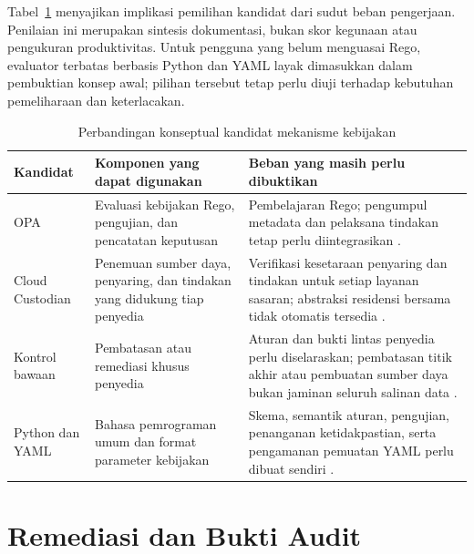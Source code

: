 Tabel~\ref{tab:b2-kandidat} menyajikan implikasi pemilihan kandidat dari sudut beban pengerjaan. Penilaian ini merupakan sintesis dokumentasi, bukan skor kegunaan atau pengukuran produktivitas. Untuk pengguna yang belum menguasai Rego, evaluator terbatas berbasis Python dan YAML layak dimasukkan dalam pembuktian konsep awal; pilihan tersebut tetap perlu diuji terhadap kebutuhan pemeliharaan dan keterlacakan.
\begingroup
\small
\setlength{\parskip}{0pt}
\setlength{\tabcolsep}{4pt}
\begin{table}[tbp]
\centering
\caption{Perbandingan konseptual kandidat mekanisme kebijakan}\label{tab:b2-kandidat}
\begin{tabular}{@{}>{\raggedright\arraybackslash}p{}>{\raggedright\arraybackslash}p{}>{\raggedright\arraybackslash}p{}@{}}
\toprule
Kandidat & Komponen yang dapat digunakan & Beban yang masih perlu dibuktikan \\
\midrule
OPA & Evaluasi kebijakan Rego, pengujian, dan pencatatan keputusan & Pembelajaran Rego; pengumpul metadata dan pelaksana tindakan tetap perlu diintegrasikan \autocite{b2c_opaOverview,b2c_opaTesting}. \\
\addlinespace
Cloud Custodian & Penemuan sumber daya, penyaring, dan tindakan yang didukung tiap penyedia & Verifikasi kesetaraan penyaring dan tindakan untuk setiap layanan sasaran; abstraksi residensi bersama tidak otomatis tersedia \autocite{b2c_custodianOverview,b2c_custodianS3,b2c_custodianGcpBucket}. \\
\addlinespace
Kontrol bawaan & Pembatasan atau remediasi khusus penyedia & Aturan dan bukti lintas penyedia perlu diselaraskan; pembatasan titik akhir atau pembuatan sumber daya bukan jaminan seluruh salinan data \autocite{b2c_awsRegionCondition,b2c_azurePolicyLocations,b2c_gcpLocationConstraint}. \\
\addlinespace
Python dan YAML & Bahasa pemrograman umum dan format parameter kebijakan & Skema, semantik aturan, pengujian, penanganan ketidakpastian, serta pengamanan pemuatan YAML perlu dibuat sendiri \autocite{b2c_pyyamlDocs}. \\
\bottomrule
\end{tabular}
\end{table}
\endgroup

\section{Remediasi dan Bukti Audit}
\label{sec:b2c-remediasi-audit}

